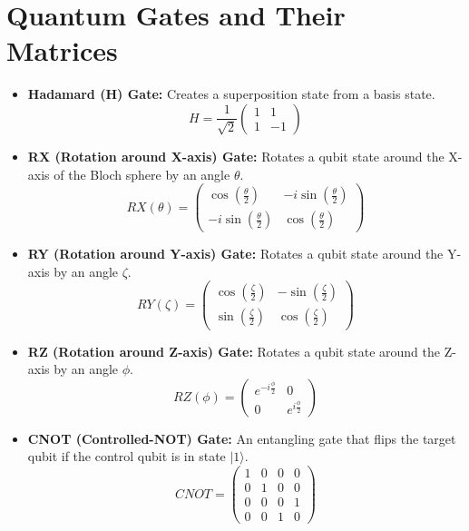 \documentclass{article}
\begin{document}
\section*{Quantum Gates and Their Matrices}

\begin{itemize}
    \item \textbf{Hadamard (H) Gate:} Creates a superposition state from a basis state.
    \[
    H = \frac{1}{\sqrt{2}}
    \begin{pmatrix}
        1 & 1 \\
        1 & -1
    \end{pmatrix}
    \]
    
    \item \textbf{RX (Rotation around X-axis) Gate:} Rotates a qubit state around the X-axis of the Bloch sphere by an angle $\theta$.
    \[
    RX(\theta) = 
    \begin{pmatrix}
        \cos\left(\frac{\theta}{2}\right) & -i\sin\left(\frac{\theta}{2}\right) \\
        -i\sin\left(\frac{\theta}{2}\right) & \cos\left(\frac{\theta}{2}\right)
    \end{pmatrix}
    \]
    
    \item \textbf{RY (Rotation around Y-axis) Gate:} Rotates a qubit state around the Y-axis by an angle $\zeta$.
    \[
    RY(\zeta) = 
    \begin{pmatrix}
        \cos\left(\frac{\zeta}{2}\right) & -\sin\left(\frac{\zeta}{2}\right) \\
        \sin\left(\frac{\zeta}{2}\right) & \cos\left(\frac{\zeta}{2}\right)
    \end{pmatrix}
    \]
    
    \item \textbf{RZ (Rotation around Z-axis) Gate:} Rotates a qubit state around the Z-axis by an angle $\phi$.
    \[
    RZ(\phi) = 
    \begin{pmatrix}
        e^{-i\frac{\phi}{2}} & 0 \\
        0 & e^{i\frac{\phi}{2}}
    \end{pmatrix}
    \]
    
    \item \textbf{CNOT (Controlled-NOT) Gate:} An entangling gate that flips the target qubit if the control qubit is in state $|1\rangle$.
    \[
    CNOT = 
    \begin{pmatrix}
        1 & 0 & 0 & 0 \\
        0 & 1 & 0 & 0 \\
        0 & 0 & 0 & 1 \\
        0 & 0 & 1 & 0
    \end{pmatrix}
    \]
\end{itemize}
\end{document}
